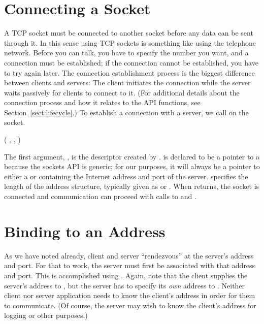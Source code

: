 \section{Connecting a Socket}
\label{sect:connectingASocket}

A TCP socket must be connected to another socket before any data can
be sent through it.  In this sense using TCP sockets is something like
using the telephone network. Before you can talk, you have to specify
the number you want, and a connection must be established; if the
connection cannot be established, you have to try again later.  The
connection establishment process is the biggest difference between
clients and servers: The client initiates the connection while the
server waits passively for clients to connect to it.  (For additional
details about the connection process and how it relates to the API
functions, see Section~\ref{sect:lifecycle}.)  To establish a
connection with a server, we call  on the
socket.

\begin{inlinefcn}
 ( , 
, 
 )
\end{inlinefcn}

The first argument, , is the descriptor created by
.   is declared to
be a pointer to a  because the sockets
API is generic; for our purposes, it will always be a pointer to either a
 or  containing the Internet
address and port of the server.   specifies the
length of the address structure, typically given as
 or . When  returns, the socket is connected and
communication can proceed with calls to  and
.

\section{Binding to an Address}
\label{sect:bindingToAnAddress}

As we have noted already, client and server ``rendezvous'' at the
server's address and port.  For that to work, the server must first be
associated with that address and port.
This is accomplished using .
Again, note that the client supplies
the server's address to , but the
server has to specify its \emph{own\/} address
to .
Neither client nor server application needs to know the 
client's address in order for them to communicate.  (Of course, the
server may wish to know the client's address for logging or other
purposes.) 

